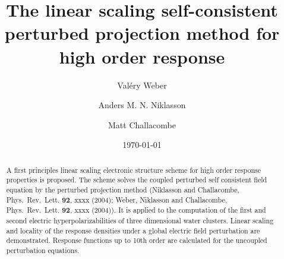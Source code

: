 \documentclass[prl,aps,twocolumn,showpacs,twocolumngrid,superbib]{revtex4}
\begin{document}

\title{The linear scaling self-consistent perturbed projection 
       method for high order response}

\author{Val\'ery Weber}
\author{Anders M. N. Niklasson}%
\author{Matt Challacombe}%

%

\date{\today}%

\begin{abstract}
A first principles linear scaling electronic structure scheme for high order 
response properties is proposed. The scheme solves the coupled perturbed self 
consistent field equation by the perturbed projection method (Niklasson and Challacombe, 
Phys.\ Rev.\ Lett. {\bf 92}, xxxx (2004); Weber, Niklasson and  Challacombe, 
Phys.\ Rev.\ Lett. {\bf 92}, xxxx (2004)). It is applied to the computation 
of the first and second electric hyperpolarizabilities of three
dimensional water clusters. Linear scaling and locality of the response
densities under a global electric field perturbation are demonstrated. 
Response functions up to 10th order are calculated for the uncoupled perturbation 
equations.
\end{abstract}

\maketitle
\end{document}
